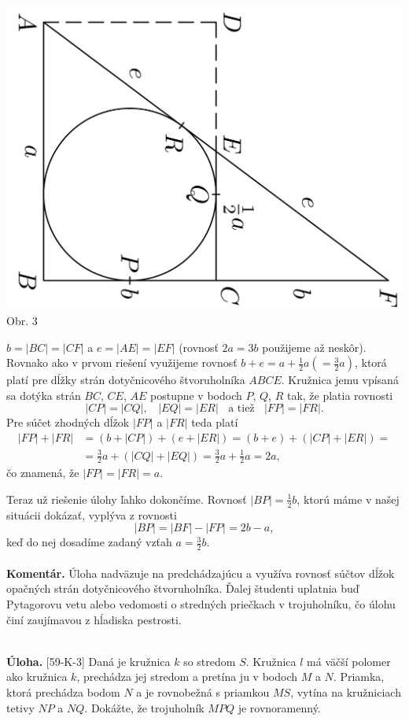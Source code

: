 \documentclass[11pt,a4paper,oneside,final]{book}
\newcommand{\kom}{\textbf{Komentár.} }
\newcommand{\ul}{\textbf{Úloha.} }
\begin{document}
\begin{center}
\includegraphics[scale=0.3, angle=90]{61K32}\\

Obr. 3
\end{center}
$b = |BC| = |CF|$ a $e = |AE| = |EF|$ (rovnosť $2a = 3b$ použijeme až neskôr). Rovnako ako v prvom riešení využijeme rovnosť $b+e = a+\frac{1}{2}a (=\frac{3}{2}a)$, ktorá platí pre dĺžky strán dotyčnicového štvoruholníka $ABCE$. Kružnica jemu vpísaná sa dotýka strán $BC$, $CE$, $AE$ postupne v bodoch $P$, $Q$, $R$ tak, že platia rovnosti
$$|CP| = |CQ|, \ \ \ \ |EQ| = |ER| \ \ \ \ \text{a tiež}\ \ \ \ |FP| = |FR|.$$
Pre súčet zhodných dĺžok $|FP|$ a $|FR|$ teda platí
\begin{align*}
|FP| + |FR| &= (b + |CP|) + (e + |ER|) = (b + e) + (|CP| + |ER|) =\\
&=\frac{3}{2}a + (|CQ| + |EQ|) = \frac{3}{2}a + \frac{1}{2}a = 2a,
\end{align*}
čo znamená, že $|FP| = |FR| = a$.

Teraz už riešenie úlohy ľahko dokončíme. Rovnosť $|BP| =\frac{1}{2}b$, ktorú máme v našej situácii dokázať, vyplýva z rovnosti
$$|BP| = |BF| - |FP| = 2b -a,$$
keď do nej dosadíme zadaný vzťah $a=\frac{3}{2}b$.\\
\\
\kom Úloha nadväzuje na predchádzajúcu a využíva rovnosť súčtov dĺžok opačných strán dotyčnicového štvoruholníka. Ďalej študenti uplatnia buď Pytagorovu vetu alebo vedomosti o stredných priečkach v trojuholníku, čo úlohu činí zaujímavou z hĺadiska pestrosti.\\
\\
\begin{tcolorbox}[breakable,notitle,boxrule=0pt,colback=light-gray,colframe=light-gray]\ul [59-K-3]  Daná je kružnica $k$ so stredom $S$. Kružnica $l$ má väčší polomer ako kružnica $k$, prechádza jej stredom a pretína ju v bodoch $M$ a $N$. Priamka, ktorá prechádza bodom $N$ a je rovnobežná s priamkou $MS$, vytína na kružniciach tetivy $NP$ a $NQ$. Dokážte, že trojuholník $MPQ$ je rovnoramenný.

\end{tcolorbox}
\end{document}
